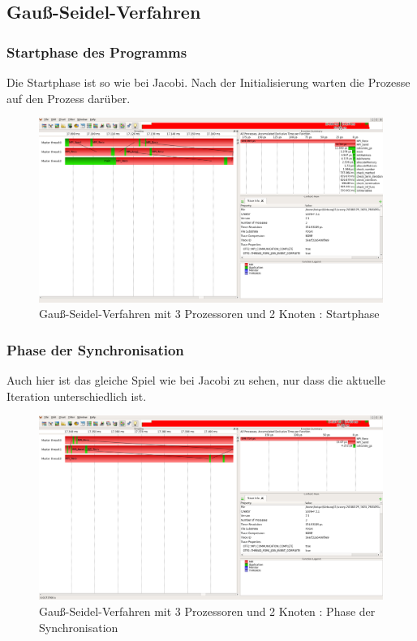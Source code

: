 \documentclass[11pt,a4paper]{article}
\begin{document}
\subsection{Gauß-Seidel-Verfahren}


\subsubsection{Startphase des Programms}
Die Startphase ist so wie bei Jacobi. Nach der Initialisierung warten die Prozesse auf den Prozess darüber.
\begin{figure}[htbp] %
   \centering
   \includegraphics[width=1\textwidth]{Seidel_1.png} 
   \caption{Gauß-Seidel-Verfahren mit 3 Prozessoren und 2 Knoten : Startphase}
   \label{Seidel_1}
\end{figure}

\subsubsection{Phase der Synchronisation}
Auch hier ist das gleiche Spiel wie bei Jacobi zu sehen, nur dass die aktuelle Iteration unterschiedlich ist.
\begin{figure}[htbp] %
   \centering
   \includegraphics[width=1\textwidth]{Seidel_2.png} 
   \caption{Gauß-Seidel-Verfahren mit 3 Prozessoren und 2 Knoten : Phase der Synchronisation}
   \label{Seidel_2}
\end{figure}
\end{document}
